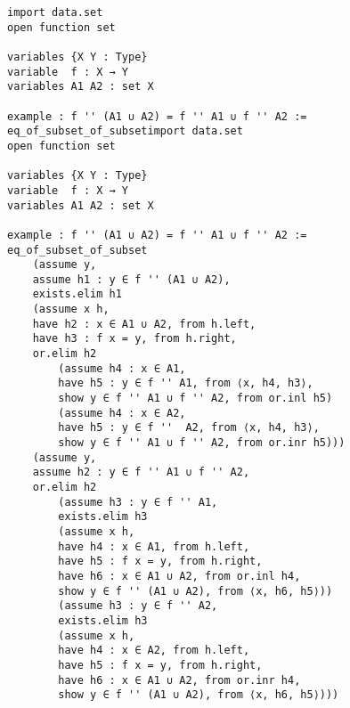 \begin{enumerate}
\begin{lstlisting}
import data.set
open function set

variables {X Y : Type}
variable  f : X → Y
variables A1 A2 : set X

example : f '' (A1 ∪ A2) = f '' A1 ∪ f '' A2 :=
eq_of_subset_of_subsetimport data.set
open function set

variables {X Y : Type}
variable  f : X → Y
variables A1 A2 : set X

example : f '' (A1 ∪ A2) = f '' A1 ∪ f '' A2 :=
eq_of_subset_of_subset
    (assume y,
    assume h1 : y ∈ f '' (A1 ∪ A2),
    exists.elim h1
    (assume x h,
    have h2 : x ∈ A1 ∪ A2, from h.left,
    have h3 : f x = y, from h.right,
    or.elim h2
        (assume h4 : x ∈ A1,
        have h5 : y ∈ f '' A1, from ⟨x, h4, h3⟩,
        show y ∈ f '' A1 ∪ f '' A2, from or.inl h5)
        (assume h4 : x ∈ A2,
        have h5 : y ∈ f ''  A2, from ⟨x, h4, h3⟩,
        show y ∈ f '' A1 ∪ f '' A2, from or.inr h5)))
    (assume y,
    assume h2 : y ∈ f '' A1 ∪ f '' A2,
    or.elim h2
        (assume h3 : y ∈ f '' A1,
        exists.elim h3 
        (assume x h,
        have h4 : x ∈ A1, from h.left,
        have h5 : f x = y, from h.right,
        have h6 : x ∈ A1 ∪ A2, from or.inl h4,
        show y ∈ f '' (A1 ∪ A2), from ⟨x, h6, h5⟩))
        (assume h3 : y ∈ f '' A2,
        exists.elim h3 
        (assume x h,
        have h4 : x ∈ A2, from h.left,
        have h5 : f x = y, from h.right,
        have h6 : x ∈ A1 ∪ A2, from or.inr h4,
        show y ∈ f '' (A1 ∪ A2), from ⟨x, h6, h5⟩)))
\end{lstlisting}
\end{enumerate}